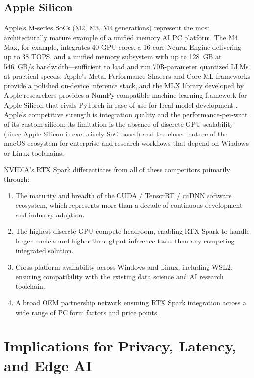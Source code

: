 \documentclass[conference]{IEEEtran}
\begin{document}
\subsection{Apple Silicon}

Apple's M-series SoCs (M2, M3, M4 generations) represent the most architecturally mature example of a unified memory AI PC platform. The M4 Max, for example, integrates 40 GPU cores, a 16-core Neural Engine delivering up to 38 TOPS, and a unified memory subsystem with up to 128~GB at 546~GB/s bandwidth---sufficient to load and run 70B-parameter quantized LLMs at practical speeds. Apple's Metal Performance Shaders and Core ML frameworks provide a polished on-device inference stack, and the MLX library developed by Apple researchers provides a NumPy-compatible machine learning framework for Apple Silicon that rivals PyTorch in ease of use for local model development \cite{mlx2024}. Apple's competitive strength is integration quality and the performance-per-watt of its custom silicon; its limitation is the absence of discrete GPU scalability (since Apple Silicon is exclusively SoC-based) and the closed nature of the macOS ecosystem for enterprise and research workflows that depend on Windows or Linux toolchains.

NVIDIA's RTX Spark differentiates from all of these competitors primarily through:
\begin{enumerate}
    \item The maturity and breadth of the CUDA / TensorRT / cuDNN software ecosystem, which represents more than a decade of continuous development and industry adoption.
    \item The highest discrete GPU compute headroom, enabling RTX Spark to handle larger models and higher-throughput inference tasks than any competing integrated solution.
    \item Cross-platform availability across Windows and Linux, including WSL2, ensuring compatibility with the existing data science and AI research toolchain.
    \item A broad OEM partnership network ensuring RTX Spark integration across a wide range of PC form factors and price points.
\end{enumerate}

\section{Implications for Privacy, Latency, and Edge AI}
\label{sec:implications}
\end{document}

